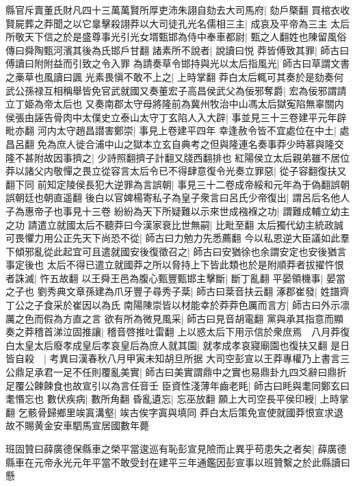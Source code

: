 縣官斥賣董氏財凡四十三萬萬賢所厚吏沛朱詡自劾去大司馬府|{
	劾戶槩翻}
買棺衣收賢屍葬之莽聞之以它辠擊殺詡莽以大司徒孔光名儒相三主|{
	成哀及平帝為三主}
太后所敬天下信之於是盛尊事光引光女壻甄邯為侍中奉車都尉|{
	甄之人翻姓也陳留風俗傳曰舜陶甄河濱其後為氏邯戶甘翻}
諸素所不說者|{
	說讀曰悦}
莽皆傅致其罪|{
	師古曰傅讀曰附附益而引致之令入罪}
為請奏草令邯持與光以太后指風光|{
	師古曰草謂文書之槀草也風讀曰諷}
光素畏愼不敢不上之|{
	上時掌翻}
莽白太后輒可其奏於是劾奏何武公孫禄互相稱舉皆免官武就國又奏董宏子高昌侯武父為佞邪奪爵|{
	宏為佞邪謂請立丁姫為帝太后也}
又奏南郡太守母將隆前為冀州牧治中山馮太后獄寃陷無辜關内侯張由誣告骨肉中太僕史立泰山太守丁玄陷人入大辟|{
	事並見三十三卷建平元年辟毗亦翻}
河内太守趙昌譛害鄭崇|{
	事見上卷建平四年}
幸逢赦令皆不宜處位在中土|{
	處昌呂翻}
免為庶人徙合浦中山之獄本立玄自典考之但與隆連名奏事莽少時慕與隆交隆不甚附故因事擠之|{
	少詩照翻擠子計翻又牋西翻排也}
紅陽侯立太后親弟雖不居位莽以諸父内敬憚之畏立從容言太后令已不得肆意復令光奏立罪惡|{
	從子容翻復扶又翻下同}
前知定陵侯長犯大逆罪為言誤朝|{
	事見三十二卷成帝綏和元年為于偽翻誤朝誤朝廷也朝直遥翻}
後白以官婢楊寄私子為皇子衆言曰呂氏少帝復出|{
	謂呂后名他人子為惠帝子也事見十三卷}
紛紛為天下所疑難以示來世成襁褓之功|{
	謂難成輔立幼主之功}
請遣立就國太后不聽莽曰今漢家衰比世無嗣|{
	比毗至翻}
太后獨代幼主統政誠可畏懼力用公正先天下尚恐不從|{
	師古曰力勉力先悉薦翻}
今以私恩逆大臣議如此羣下傾邪亂從此起宜可且遣就國安後復徵召之|{
	師古曰安猶徐也余謂安定也安後猶言事定後也}
太后不得已遣立就國莽之所以脅持上下皆此類也於是附順莽者拔擢忤恨者誅滅|{
	忤五故翻}
以王舜王邑為腹心甄豐甄邯主擊斷|{
	斷丁亂翻}
平晏領機事|{
	晏當之子也}
劉秀典文章孫建為爪牙豐子尋秀子棻|{
	師古曰棻音扶云翻}
涿郡崔發|{
	姓譜齊丁公之子食采於崔因以為氏}
南陽陳崇皆以材能幸於莽莽色厲而言方|{
	師古曰外示凛厲之色而假為方直之言}
欲有所為微見風采|{
	師古曰見音胡電翻}
黨與承其指意而顯奏之莽稽首涕泣固推讓|{
	稽音啓推吐雷翻}
上以惑太后下用示信於衆庶焉　八月莽復白太皇太后廢孝成皇后孝哀皇后為庶人就其園|{
	就孝成孝哀寢廟園也復扶又翻}
是日皆自殺　|{
	考異曰漢春秋八月甲寅未知胡旦所据}
大司空彭宣以王莽專權乃上書言三公鼎足承君一足不任則覆亂美實|{
	師古曰美實謂鼎中之實也易鼎卦九四爻辭曰鼎折足覆公餗餗食也故宣引以為言任音壬}
臣資性淺薄年齒老眊|{
	師古曰眊與耄同鄭玄曰耄惽忘也}
數伏疾病|{
	數所角翻}
昏亂遺忘|{
	忘巫放翻}
願上大司空長平侯印綬|{
	上時掌翻}
乞骸骨歸鄉里竢寘溝壑|{
	竢古俟字寘與填同}
莽白太后策免宣使就國莽恨宣求退故不賜黄金安車駟馬宣居國數年薨

班固贊曰薛廣德保縣車之榮平當逡巡有恥彭宣見險而止異乎苟患失之者矣|{
	薛廣德縣車在元帝永光元年平當不敢受封在建平三年通鑑因彭宣事以班贊繫之於此縣讀曰懸}


